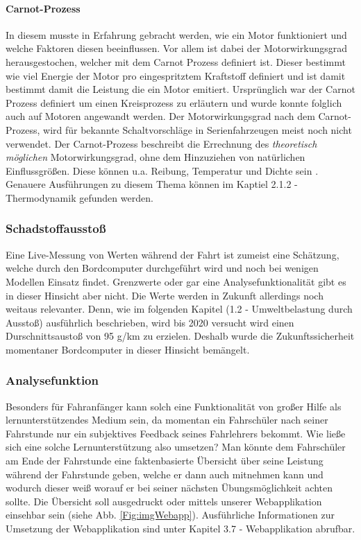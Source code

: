\paragraph{Carnot-Prozess}
In diesem musste in Erfahrung gebracht werden, wie ein Motor funktioniert und welche Faktoren diesen beeinflussen. Vor allem ist dabei der Motorwirkungsgrad herausgestochen, welcher mit dem Carnot Prozess definiert ist. Dieser bestimmt wie viel Energie der Motor pro eingespritztem Kraftstoff definiert und ist damit bestimmt damit die Leistung die ein Motor emitiert. Ursprünglich war der Carnot Prozess definiert um einen Kreisprozess zu erläutern und wurde konnte folglich auch auf Motoren angewandt werden.
Der Motorwirkungsgrad nach dem Carnot-Prozess, wird für bekannte Schaltvorschläge in Serienfahrzeugen meist noch nicht verwendet. Der Carnot-Prozess beschreibt die Errechnung des \textit{theoretisch möglichen} Motorwirkungsgrad, ohne dem Hinzuziehen von natürlichen Einflussgrößen. Diese können u.a. Reibung, Temperatur und Dichte sein \cite{SIMR.CH1-Fahrstil-Analyse.CarnotWirkungsgrad}. Genauere Ausführungen zu diesem Thema können im Kaptiel 2.1.2 - Thermodynamik gefunden werden. 

\subsubsection{Schadstoffausstoß}
Eine Live-Messung von  Werten während der Fahrt ist zumeist eine Schätzung, welche durch den Bordcomputer durchgeführt wird und noch bei wenigen Modellen Einsatz findet. Grenzwerte oder gar eine Analysefunktionalität gibt es in dieser Hinsicht aber nicht. Die  Werte werden in Zukunft allerdings noch weitaus relevanter. Denn, wie im folgenden Kapitel (1.2 - Umweltbelastung durch  Ausstoß) ausführlich beschrieben, wird bis 2020 versucht wird einen Durschnittsaustoß von 95 g/km zu erzielen. \cite{SIMR.CH1-Fahrstil_Analyse.EUVerordCO2} Deshalb wurde die Zukunftssicherheit momentaner Bordcomputer in dieser Hinsicht bemängelt.

\subsubsection{Analysefunktion}
Besonders für Fahranfänger kann solch eine Funktionalität von großer Hilfe als lernunterstützendes Medium sein, da momentan ein Fahrschüler nach seiner Fahrstunde nur ein subjektives Feedback seines Fahrlehrers bekommt. Wie ließe sich eine solche Lernunterstützung also umsetzen?
Man könnte dem Fahrschüler am Ende der Fahrstunde eine faktenbasierte Übersicht über seine Leistung während der Fahrstunde geben, welche er dann auch mitnehmen kann und wodurch dieser weiß worauf er bei seiner nächsten Übungsmöglichkeit achten sollte. Die Übersicht soll ausgedruckt oder mittels unserer Webapplikation einsehbar sein (siehe Abb. \autoref{Fig:imgWebapp}). Ausführliche Informationen zur Umsetzung der Webapplikation sind unter Kapitel 3.7 - Webapplikation abrufbar.

